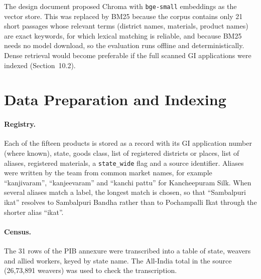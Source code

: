 The design document proposed Chroma with \texttt{bge-small} embeddings as the vector store. This was
replaced by BM25 because the corpus contains only 21 short passages whose relevant terms (district
names, materials, product names) are exact keywords, for which lexical matching is reliable, and
because BM25 needs no model download, so the evaluation runs offline and deterministically. Dense
retrieval would become preferable if the full scanned GI applications were indexed (Section~10.2).

\section{Data Preparation and Indexing}

\paragraph{Registry.} Each of the fifteen products is stored as a record with its GI application number
(where known), state, goods class, list of registered districts or places, list of aliases, registered
materials, a \texttt{state\_wide} flag and a source identifier. Aliases were written by the team from
common market names, for example ``kanjivaram'', ``kanjeevaram'' and ``kanchi pattu'' for Kancheepuram
Silk. When several aliases match a label, the longest match is chosen, so that ``Sambalpuri ikat''
resolves to Sambalpuri Bandha rather than to Pochampalli Ikat through the shorter alias ``ikat''.

\paragraph{Census.} The 31 rows of the PIB annexure were transcribed into a table of state, weavers and
allied workers, keyed by state name. The All-India total in the source (26,73,891 weavers) was used to
check the transcription.

